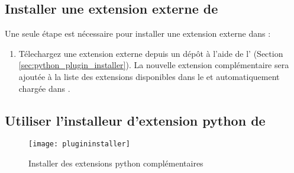 \subsection{Installer une extension externe de \qg}\label{sec:load_external_plugin} 

Une seule étape est nécessaire pour installer une extension externe dans \qg :

\begin{enumerate}
\item Télechargez une extension externe depuis un dépôt à l'aide de l' (Section \ref{sec:python_plugin_installer}). La nouvelle extension complémentaire sera ajoutée à la liste des extensions disponibles dans le  et automatiquement chargée dans \qg.
\end{enumerate}

\subsection{Utiliser l'installeur d'extension python de \qg}\label{sec:python_plugin_installer}

\begin{figure}[ht]
   \begin{center}
   \texttt{[image: plugininstaller]}
   \caption{Installer des extensions python complémentaires\nixcaption}
\label{fig:plugininstaller}
\end{center}
\end{figure}

